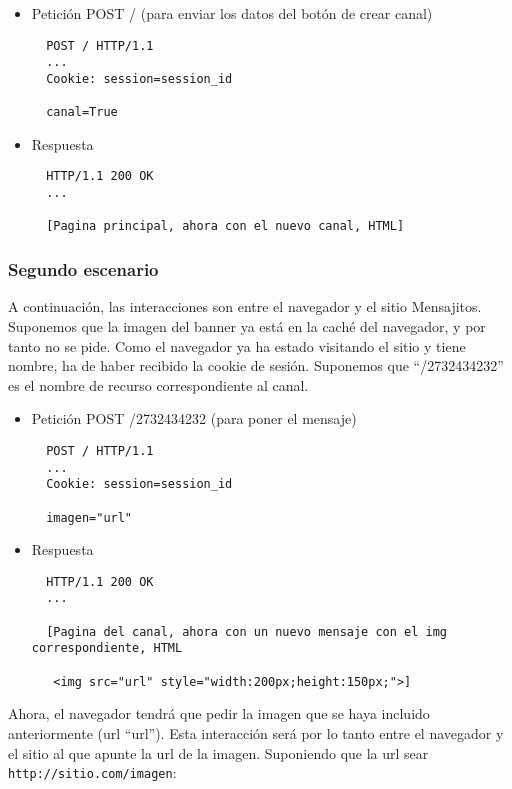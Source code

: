 \begin{itemize}
\item Petición POST / (para enviar los datos del botón de crear canal)

\begin{verbatim}
  POST / HTTP/1.1
  ...
  Cookie: session=session_id

  canal=True
\end{verbatim}

\item Respuesta

\begin{verbatim}
  HTTP/1.1 200 OK
  ...

  [Pagina principal, ahora con el nuevo canal, HTML]
\end{verbatim}

\end{itemize}

\subsubsection*{Segundo escenario}

A continuación, las interacciones son entre el navegador y el sitio Mensajitos. Suponemos que la imagen del banner ya está en la caché del navegador, y por tanto no se pide. Como el navegador ya ha estado visitando el sitio y tiene nombre, ha de haber recibido la cookie de sesión. Suponemos que ``/2732434232'' es el nombre de recurso correspondiente al canal.

\begin{itemize}
\item Petición POST /2732434232 (para poner el mensaje)

\begin{verbatim}
  POST / HTTP/1.1
  ...
  Cookie: session=session_id

  imagen="url"
\end{verbatim}

\item Respuesta

\begin{verbatim}
  HTTP/1.1 200 OK
  ...

  [Pagina del canal, ahora con un nuevo mensaje con el img correspondiente, HTML
   
   <img src="url" style="width:200px;height:150px;">]
\end{verbatim}

\end{itemize}

Ahora, el navegador tendrá que pedir la imagen que se haya incluido anteriormente (url ``url''). Esta interacción será por lo tanto entre el navegador y el sitio al que apunte la url de la imagen. Suponiendo que la url sear \verb|http://sitio.com/imagen|:

